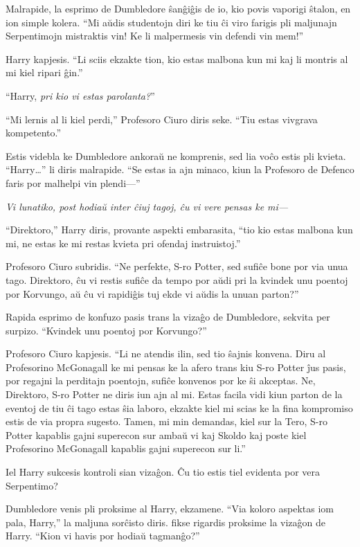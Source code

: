 Malrapide, la esprimo de Dumbledore ŝanĝiĝis de io, kio povis vaporigi
ŝtalon, en ion simple kolera. ``Mi aŭdis studentojn diri ke tiu ĉi
viro farigis pli maljunajn Serpentimojn mistraktis vin! Ke li
malpermesis vin defendi vin mem!''

Harry kapjesis. ``Li sciis ekzakte tion, kio estas malbona kun mi kaj
li montris al mi kiel ripari ĝin.''

``Harry, \emph{pri kio vi estas parolanta?}''

``Mi lernis al li kiel perdi,'' Profesoro Ciuro diris seke. ``Tiu estas vivgrava kompetento.''

Estis videbla ke Dumbledore ankoraŭ ne komprenis, sed lia voĉo estis
pli kvieta. ``Harry\ldots'' li diris malrapide. ``Se estas ia ajn
minaco, kiun la Profesoro de Defenco faris por malhelpi vin plendi—''

\emph{Vi lunatiko, post hodiaŭ inter ĉiuj tagoj, ĉu vi vere pensas ke mi—}

``Direktoro,'' Harry diris, provante aspekti embarasita, ``tio kio
estas malbona kun mi, ne estas ke mi restas kvieta pri ofendaj
instruistoj.''

Profesoro Ciuro subridis. ``Ne perfekte, S-ro Potter, sed sufiĉe bone
por via unua tago. Direktoro, ĉu vi restis sufiĉe da tempo por aŭdi
pri la kvindek unu poentoj por Korvungo, aŭ ĉu vi rapidiĝis tuj ekde
vi aŭdis la unuan parton?''

Rapida esprimo de konfuzo pasis trans la vizaĝo de Dumbledore, sekvita
per surpizo. ``Kvindek unu poentoj por Korvungo?''

Profesoro Ciuro kapjesis. ``Li ne atendis ilin, sed tio ŝajnis
konvena. Diru al Profesorino McGonagall ke mi pensas ke la afero trans
kiu S-ro Potter ĵus pasis, por regajni la perditajn poentojn, sufiĉe
konvenos por ke ŝi akceptas. Ne, Direktoro, S-ro Potter ne diris iun
ajn al mi. Estas facila vidi kiun parton de la eventoj de tiu ĉi tago
estas ŝia laboro, ekzakte kiel mi scias ke la fina kompromiso estis de
via propra sugesto. Tamen, mi min demandas, kiel sur la Tero, S-ro
Potter kapablis gajni superecon sur ambaŭ vi kaj Skoldo kaj poste kiel
Profesorino McGonagall kapablis gajni superecon sur li.''

Iel Harry sukcesis kontroli sian vizaĝon. Ĉu tio estis tiel evidenta
por vera Serpentimo?

Dumbledore venis pli proksime al Harry, ekzamene. ``Via koloro
aspektas iom pala, Harry,'' la maljuna sorĉisto diris. fikse rigardis
proksime la vizaĝon de Harry. ``Kion vi havis por hodiaŭ tagmanĝo?''


